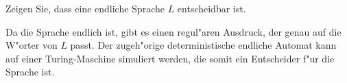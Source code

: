 Zeigen Sie, dass eine endliche Sprache $L$ entscheidbar ist.

\begin{loesung}
Da die Sprache endlich ist, gibt es einen regul"aren Ausdruck,
der genau auf die W"orter von $L$ passt. Der zugeh"orige deterministische
endliche Automat kann auf einer Turing-Maschine simuliert werden,
die somit ein Entscheider f"ur die Sprache ist.
\end{loesung}
